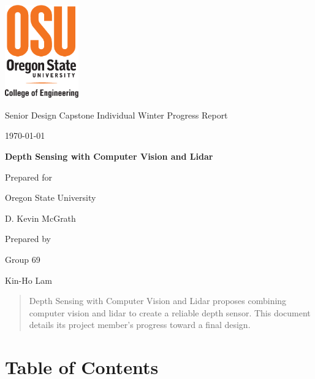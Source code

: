 \documentclass[onecolumn, draftclsnofoot,10pt, compsoc]{IEEEtran}
\def \CapstoneTeamName{			}
\def \CapstoneTeamNumber{		69}
\def \GroupMemberOne{			Kin-Ho Lam}
\def \CapstoneProjectName{		Depth Sensing with Computer Vision and Lidar}
\def \CapstoneSponsorCompany{	Oregon State University}
\def \CapstoneSponsorPerson{	D. Kevin McGrath}
\def \DocType{
	Individual Winter Progress Report
}
\newcommand{\NameSigPair}[1]{\par
	\makebox[2.75in][r]{#1} \hfil 	\makebox[3.25in]{\makebox[2.25in]{\hrulefill} \hfill		\makebox[.75in]{\hrulefill}}
	\par\vspace{-12pt} \textit{\tiny\noindent
		\makebox[2.75in]{} \hfil		\makebox[3.25in]{\makebox[2.25in][r]{Signature} \hfill	\makebox[.75in][r]{Date}}}}
\renewcommand{\NameSigPair}[1]{#1}
\begin{document}
	\begin{titlepage}
		\begin{singlespace}
			\centering
			\includegraphics[height=4cm,natwidth=345,natheight=435]{images/osu_logo.png}
			\hfill 
			\par\vspace{.2in}
			\centering
			\scshape{
				\huge Senior Design Capstone \DocType \par
				{\large\today}\par
				\vspace{.5in}
				\textbf{\Huge\CapstoneProjectName}\par
				\vfill
				{\large Prepared for}\par
				\Huge \CapstoneSponsorCompany\par
				\vspace{5pt}
				{\Large\NameSigPair{\CapstoneSponsorPerson}\par}
				{\large Prepared by }\par
				Group\CapstoneTeamNumber\par
				\CapstoneTeamName\par 
				\vspace{5pt}
				{\large
					\NameSigPair{\GroupMemberOne}\par
				}
				\vspace{20pt}
			}
			\begin{abstract}  
 				Depth Sensing with Computer Vision and Lidar proposes combining computer vision and lidar to create a reliable depth sensor.
				This document details its project member's progress toward a final design.
			\end{abstract}     
		\end{singlespace}
	\end{titlepage}
\section{Table of Contents}
\tableofcontents


\clearpage
\end{document}
